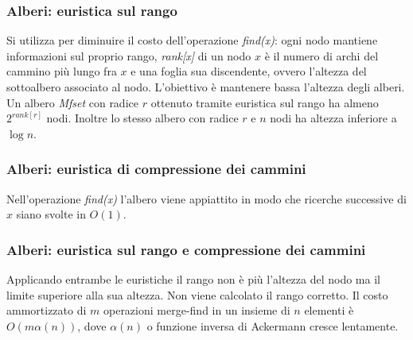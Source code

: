 \subsubsection{Alberi: euristica sul rango}
Si utilizza per diminuire il costo dell'operazione \emph{find(x)}: ogni nodo mantiene informazioni sul proprio rango, \emph{rank[x]} di un nodo $x$ \`e il numero di archi del cammino pi\`u lungo fra $x$ e una 
foglia sua discendente, ovvero l'altezza del sottoalbero associato al nodo. L'obiettivo \`e mantenere bassa l'altezza degli alberi. Un albero \emph{Mfset} con radice $r$ ottenuto tramite euristica sul
rango ha almeno $2^{rank[r]}$ nodi. Inoltre lo stesso albero con radice $r$ e $n$ nodi ha altezza inferiore a $\log n$. 
\begin{multicols}{2}

\columnbreak

\end{multicols}
\subsubsection{Alberi: euristica di compressione dei cammini}
\begin{multicols}{2}
Nell'operazione \emph{find(x)} l'albero viene appiattito in modo che ricerche successive di $x$ siano svolte in $O(1)$.

\end{multicols}
\subsubsection{Alberi: euristica sul rango e compressione dei cammini}
Applicando entrambe le euristiche il rango non \`e pi\`u l'altezza del nodo ma il limite superiore alla sua altezza. Non viene calcolato il rango corretto. Il costo ammortizzato di $m$ operazioni merge-find in un 
insieme di $n$ elementi \`e $O(m\alpha(n))$, dove $\alpha(n)$ o funzione inversa di Ackermann cresce lentamente. 
